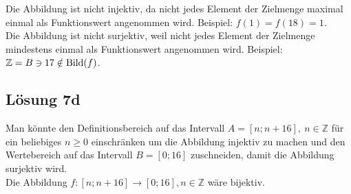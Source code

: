 \documentclass[main.tex]{subfiles}
\begin{document}
Die Abbildung ist nicht injektiv, da nicht jedes Element der Zielmenge maximal einmal als Funktionswert angenommen wird. Beispiel: $f(1) = f(18) = 1$.\\

Die Abbildung ist nicht surjektiv, weil nicht jedes Element der Zielmenge mindestens einmal als Funktionswert angenommen wird. Beispiel:
$\mathbb{Z} = B \ni  17 \notin \operatorname{Bild} (f)$.

\subsection{Lösung 7d}

Man könnte den Definitionsbereich auf das Intervall $A=[n;n+16],\ n\in \mathbb{Z}$ für ein beliebiges
$n\geq 0$ einschränken um die Abbildung injektiv zu machen und den Wertebereich auf das Intervall
$B=[0;16]$ zuschneiden, damit die Abbildung surjektiv wird.\\

Die Abbildung $f:[ n;n+16]\rightarrow [ 0;16] ,n\in \mathbb{Z}$ wäre bijektiv.
\end{document}
